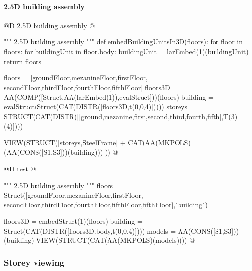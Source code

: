 \documentclass[11pt,oneside]{article}    %
\begin{document}
\paragraph{2.5D building assembly}
@D 2.5D building assembly
@{""" 2.5D building assembly """
def embedBuildingUnitsIn3D(floors):
    for floor in floors:
        for buildingUnit in floor.body:
            buildingUnit = larEmbed(1)(buildingUnit)
    return floors
        
floors = [groundFloor,mezanineFloor,firstFloor,
                secondFloor,thirdFloor,fourthFloor,fifthFloor]
floors3D = AA(COMP([Struct,AA(larEmbed(1)),evalStruct]))(floors)
building = evalStruct(Struct(CAT(DISTR([floors3D,t(0,0,4)]))))
storeys = STRUCT(CAT(DISTR([[ground,mezanine,first,second,third,fourth,fifth],T(3)(4)])))

VIEW(STRUCT([storeys,SteelFrame] + CAT(AA(MKPOLS)(AA(CONS([S1,S3]))(building))) ))
@}

@D test
@{""" 2.5D building assembly """
floors = Struct([groundFloor,mezanineFloor,firstFloor,
                secondFloor,thirdFloor,fourthFloor,fifthFloor,fifthFloor],"building")

floors3D = embedStruct(1)(floors)
building = Struct(CAT(DISTR([floors3D.body,t(0,0,4)])))
models = AA(CONS([S1,S3]))(building)
VIEW(STRUCT(CAT(AA(MKPOLS)(models))))
@}



\subsubsection{Storey viewing}
\end{document}
